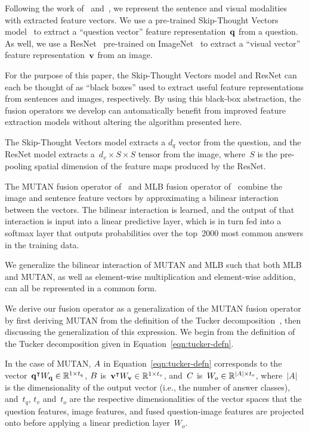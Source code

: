Following the work of~\cite{Kim2017} and~\cite{ben2017mutan}, we represent the
sentence and visual modalities with extracted feature vectors. We use a
pre-trained Skip-Thought Vectors model~\cite{kiros2015skip}
to extract a ``question vector'' feature representation~$\mathbf{q}$ from a question.
As well, we use a ResNet~\cite{he2016deep} pre-trained on
ImageNet~\cite{russakovsky2015imagenet} to extract a ``visual vector'' feature
representation~$\mathbf{v}$ from an image.

For the purpose of this paper, the Skip-Thought Vectors model and ResNet can
each be thought of as ``black boxes'' used to extract useful feature
representations from sentences and images, respectively. By using this
black-box abstraction, the fusion operators we develop can automatically
benefit from improved feature extraction models without altering the algorithm
presented here.

The Skip-Thought Vectors model extracts a $d_q$ vector from the question, and
the ResNet model extracts a~$d_v \times S \times S$ tensor from the image,
where~$S$ is the pre-pooling spatial dimension of the feature maps produced by
the ResNet.

The MUTAN fusion operator of~\cite{ben2017mutan} and MLB fusion operator
of~\cite{Kim2017} combine the image and sentence feature vectors by
approximating a bilinear interaction between the vectors. The bilinear
interaction is learned, and the output of that interaction is input into a
linear predictive layer, which is in turn fed into a softmax layer that outputs
probabilities over the top~\num{2000} most common answers in the training data.

We generalize the bilinear interaction of MUTAN and MLB such that both MLB and
MUTAN, as well as element-wise multiplication and element-wise addition, can
all be represented in a common form.

We derive our fusion operator as a generalization of the MUTAN fusion operator
by first deriving MUTAN from the definition of the Tucker
decomposition~\cite{kolda2009tensor}, then discussing the generalization of
this expression.  We begin from the definition of the Tucker decomposition
given in Equation~\ref{eqn:tucker-defn}.

In the case of MUTAN, $A$ in Equation~\ref{eqn:tucker-defn} corresponds to the
vector~$\mathbf{q}^\intercal{} W_{\mathbf{q}}{} \in \mathbb{R}^{1 \times t_q}$, $B$
is~$\mathbf{v}^\intercal{} W_{\mathbf{v}}{} \in \mathbb{R}^{1 \times t_v}$,
and~$C$ is~$W_o \in \mathbb{R}^{|A| \times t_o}$, where~$|A|$ is the
dimensionality of the output vector (i.e., the number of answer classes),
and~$t_q$, $t_v$ and~$t_o$ are the respective dimensionalities of the vector
spaces that the question features, image features, and fused question-image
features are projected onto before applying a linear prediction layer~$W_o$.

